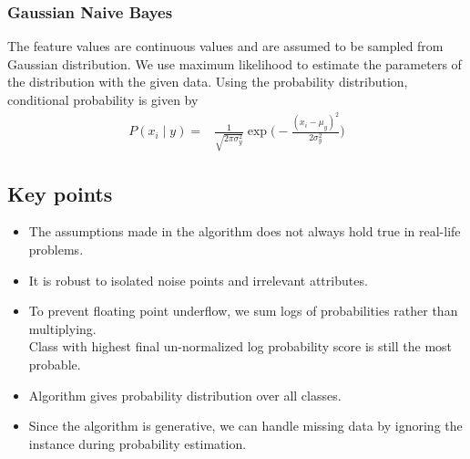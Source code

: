 \documentclass[12pt,letterpaper, onecolumn]{exam}
\begin{document}
\subsubsection*{Gaussian Naive Bayes}
The feature values are continuous values and are assumed to be sampled from Gaussian distribution. We use maximum likelihood to estimate the parameters of the distribution with the given data. Using the probability distribution, conditional probability is given by
\begin{align}
P(x_i\mid y) = {}& \frac{1}{\sqrt{2\pi \sigma_y^2}}\exp\Big(-\frac{(x_i - \mu_y)^2}{2 \sigma_y^2}\Big)
\end{align}
\subsection*{Key points}
\begin{itemize}
\item The assumptions made in the algorithm does not always hold true in real-life problems.
\item It is robust to isolated noise points and irrelevant attributes.
\item To prevent floating point underflow, we sum logs of probabilities rather than multiplying.\\ Class with highest final un-normalized log probability score is still 
the most probable.
\item Algorithm gives probability distribution over all classes.
\item Since the algorithm is generative, we can handle missing data by ignoring the instance during probability estimation.
\end{itemize}
\end{document}
